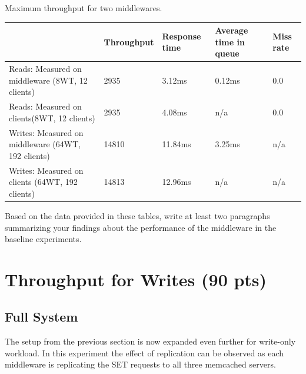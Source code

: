 \documentclass[11pt,a4paper]{article}
\begin{document}
\begin{center}
	{Maximum throughput for two middlewares.}
	\begin{tabular}{|l|p{2cm}|p{2cm}|p{2cm}|p{2cm}|}
		\hline                                                    & Throughput     & Response time & Average time in queue & Miss rate \\ 
		\hline Reads: Measured on middleware (8WT, 12 clients)    &    2935        &   3.12ms      &   0.12ms              & 0.0       \\ 
		\hline Reads: Measured on clients(8WT, 12 clients)        &    2935        &   4.08ms      & n/a                   & 0.0       \\ 
		\hline Writes: Measured on middleware (64WT, 192 clients) &    14810       &   11.84ms     &   3.25ms              & n/a       \\ 
		\hline Writes: Measured on clients (64WT, 192 clients)    &    14813       &   12.96ms     & n/a                   & n/a       \\ 
		\hline 
	\end{tabular}
\end{center}

Based on the data provided in these tables, write at least two paragraphs summarizing your findings about the performance of the middleware in the baseline experiments.

\section{Throughput for Writes (90 pts)}

\subsection{Full System} \label{sec4}
The setup from the previous section is now expanded even further for write-only workload. In this experiment the effect of replication can be observed as each middleware is replicating the SET requests to all three memcached servers.
\end{document}
